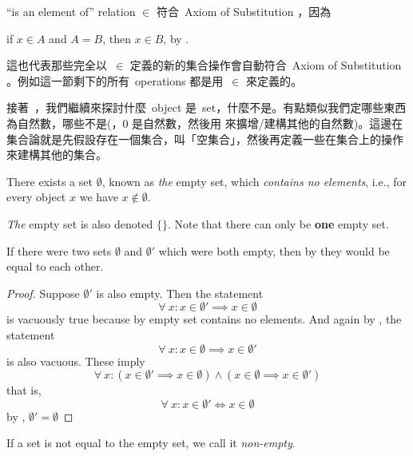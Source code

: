 \begin{note}
``is an element of'' relation \(\in\) 符合\ Axiom of Substitution ，因為
\begin{center}
    if \(x \in A\) and \(A = B\), then \(x \in B\), by .
\end{center}
這也代表那些完全以\ \(\in\) 定義的新的集合操作會自動符合\ Axiom of Substitution 。例如這一節剩下的所有\ operations 都是用\ \(\in\) 來定義的。
\end{note}
\begin{note}
接著\ ，我們繼續來探討什麼\ object 是\ set，什麼不是。有點類似我們定哪些東西為自然數，哪些不是(，\(0\) 是自然數，然後用  來擴增/建構其他的自然數)。這邊在集合論就是先假設存在一個集合，叫「空集合」，然後再定義一些在集合上的操作來建構其他的集合。
\end{note}

\begin{axiom} \label{axm 3.2}
There exists a set \(\emptyset\), known as \emph{the} empty set, which \emph{contains no elements}, i.e., for every object \(x\) we have \(x \notin \emptyset\).
\end{axiom}

\begin{note}
\emph{The} empty set is also denoted \(\{\}\). Note that there can only be \textbf{one} empty set.
\end{note}

\begin{additional corollary}  \label{ac 3.1.2}
If there were two sets \(\emptyset\) and \(\emptyset'\) which were both empty, then by  they would be equal to each other.
\end{additional corollary}
\begin{proof}
Suppose \(\emptyset'\) is also empty. Then the statement
\[
  \forall\ x : x \in \emptyset' \implies x \in \emptyset
\]
is vacuously true because by  empty set contains no elements. And again by , the statement
\[
  \forall\ x : x \in \emptyset \implies x \in \emptyset'
\]
is also vacuous. These imply
\[
  \forall\ x : (x \in \emptyset' \implies x \in \emptyset) \land (x \in \emptyset \implies x \in \emptyset')
\]
that is,
\[
  \forall\ x : x \in \emptyset' \iff x \in \emptyset
\]
by , \(\emptyset' = \emptyset\)
\end{proof}

\begin{note}
If a set is not equal to the empty set, we call it \emph{non-empty}.
\end{note}

